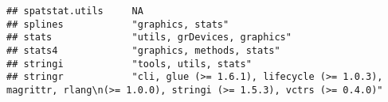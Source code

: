 \documentclass[
]{article}
\begin{document}
\begin{verbatim}
## spatstat.utils     NA                                                                                                                                                                                                                                                                                                                                                                                                                                           
## splines            "graphics, stats"                                                                                                                                                                                                                                                                                                                                                                                                                            
## stats              "utils, grDevices, graphics"                                                                                                                                                                                                                                                                                                                                                                                                                 
## stats4             "graphics, methods, stats"                                                                                                                                                                                                                                                                                                                                                                                                                   
## stringi            "tools, utils, stats"                                                                                                                                                                                                                                                                                                                                                                                                                        
## stringr            "cli, glue (>= 1.6.1), lifecycle (>= 1.0.3), magrittr, rlang\n(>= 1.0.0), stringi (>= 1.5.3), vctrs (>= 0.4.0)"                                                                                                                                                                                                                                                                                                                              

\end{verbatim}
\end{document}
